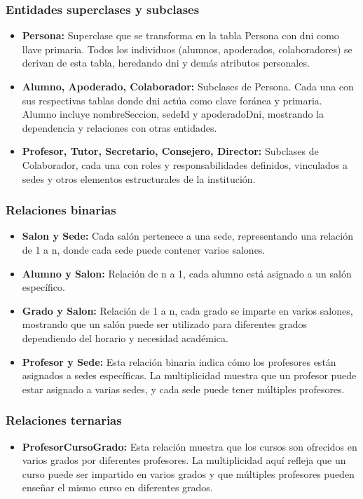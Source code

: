 \subsubsection{Entidades superclases y subclases}
\begin{itemize}
	\item \textbf{Persona:} Superclase que se transforma en la tabla Persona con dni como llave primaria. Todos los individuos (alumnos, apoderados, colaboradores) se derivan de esta tabla, heredando dni y demás atributos personales.
	\item \textbf{Alumno, Apoderado, Colaborador:} Subclases de Persona. Cada una con sus respectivas tablas donde dni actúa como clave foránea y primaria. Alumno incluye nombreSeccion, sedeId y apoderadoDni, mostrando la dependencia y relaciones con otras entidades.
	\item \textbf{Profesor, Tutor, Secretario, Consejero, Director:} Subclases de Colaborador, cada una con roles y responsabilidades definidos, vinculados a sedes y otros elementos estructurales de la institución.
\end{itemize}
\subsubsection{Relaciones binarias}
\begin{itemize}
	\item \textbf{Salon y Sede:} Cada salón pertenece a una sede, representando una relación de 1 a n, donde cada sede puede contener varios salones.
	\item \textbf{Alumno y Salon:} Relación de n a 1, cada alumno está asignado a un salón específico.
	\item \textbf{Grado y Salon:} Relación de 1 a n, cada grado se imparte en varios salones, mostrando que un salón puede ser utilizado para diferentes grados dependiendo del horario y necesidad académica.
	\item \textbf{Profesor y Sede:} Esta relación binaria indica cómo los profesores están asignados a sedes específicas. La multiplicidad muestra que un profesor puede estar asignado a varias sedes, y cada sede puede tener múltiples profesores.
\end{itemize}
\subsubsection{Relaciones ternarias}
\begin{itemize}
	\item \textbf{ProfesorCursoGrado:} Esta relación muestra que los cursos son ofrecidos en varios grados por diferentes profesores. La multiplicidad aquí refleja que un curso puede ser impartido en varios grados y que múltiples profesores pueden enseñar el mismo curso en diferentes grados.
\end{itemize}
